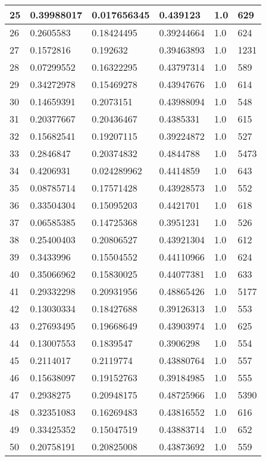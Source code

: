 \begin{longtable}{|l|l|l|l|l|l|}
25 & 0.39988017 & 0.017656345 & 0.439123 & 1.0 & 629 \\ \hline 
26 & 0.2605583 & 0.18424495 & 0.39244664 & 1.0 & 624 \\ \hline 
27 & 0.1572816 & 0.192632 & 0.39463893 & 1.0 & 1231 \\ \hline 
28 & 0.07299552 & 0.16322295 & 0.43797314 & 1.0 & 589 \\ \hline 
29 & 0.34272978 & 0.15469278 & 0.43947676 & 1.0 & 614 \\ \hline 
30 & 0.14659391 & 0.2073151 & 0.43988094 & 1.0 & 548 \\ \hline 
31 & 0.20377667 & 0.20436467 & 0.4385331 & 1.0 & 615 \\ \hline 
32 & 0.15682541 & 0.19207115 & 0.39224872 & 1.0 & 527 \\ \hline 
33 & 0.2846847 & 0.20374832 & 0.4844788 & 1.0 & 5473 \\ \hline 
34 & 0.4206931 & 0.024289962 & 0.4414859 & 1.0 & 643 \\ \hline 
35 & 0.08785714 & 0.17571428 & 0.43928573 & 1.0 & 552 \\ \hline 
36 & 0.33504304 & 0.15095203 & 0.4421701 & 1.0 & 618 \\ \hline 
37 & 0.06585385 & 0.14725368 & 0.3951231 & 1.0 & 526 \\ \hline 
38 & 0.25400403 & 0.20806527 & 0.43921304 & 1.0 & 612 \\ \hline 
39 & 0.3433996 & 0.15504552 & 0.44110966 & 1.0 & 624 \\ \hline 
40 & 0.35066962 & 0.15830025 & 0.44077381 & 1.0 & 633 \\ \hline 
41 & 0.29332298 & 0.20931956 & 0.48865426 & 1.0 & 5177 \\ \hline 
42 & 0.13030334 & 0.18427688 & 0.39126313 & 1.0 & 553 \\ \hline 
43 & 0.27693495 & 0.19668649 & 0.43903974 & 1.0 & 625 \\ \hline 
44 & 0.13007553 & 0.1839547 & 0.3906298 & 1.0 & 554 \\ \hline 
45 & 0.2114017 & 0.2119774 & 0.43880764 & 1.0 & 557 \\ \hline 
46 & 0.15638097 & 0.19152763 & 0.39184985 & 1.0 & 555 \\ \hline 
47 & 0.2938275 & 0.20948175 & 0.48725966 & 1.0 & 5390 \\ \hline 
48 & 0.32351083 & 0.16269483 & 0.43816552 & 1.0 & 616 \\ \hline 
49 & 0.33425352 & 0.15047519 & 0.43883714 & 1.0 & 652 \\ \hline 
50 & 0.20758191 & 0.20825008 & 0.43873692 & 1.0 & 559 \\ \hline 
\end{longtable}